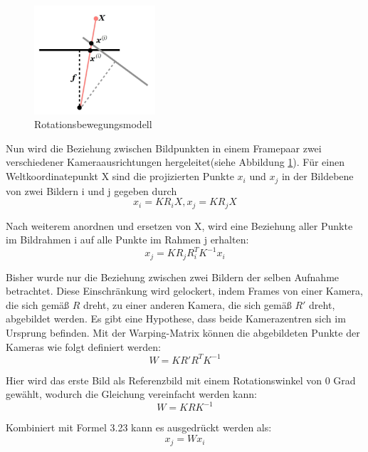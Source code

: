 \begin{figure}[H]
 \centering 
 \includegraphics[keepaspectratio,width=0.4\textwidth]{images/3_Ersteverfahren/Kamera/rotationsmodel.pdf}
 \caption{Rotationsbewegungsmodell\cite{Karpenko}}
 \label{fig:rotationsmodel}
\end{figure} 

Nun wird die Beziehung zwischen Bildpunkten in einem Framepaar zwei verschiedener Kameraausrichtungen hergeleitet(siehe Abbildung \ref{fig:rotationsmodel}). Für einen Weltkoordinatepunkt X sind die projizierten Punkte $x_i$ und $x_j$ in der Bildebene von zwei Bildern i und j gegeben durch
\begin{equation}
   x_i = KR_iX, x_j = KR_jX
\end{equation}

Nach weiterem anordnen und ersetzen von X, wird eine Beziehung aller Punkte im Bildrahmen i auf alle Punkte im Rahmen j erhalten:
\begin{equation}
   x_j = KR_jR_i^TK^{-1}x_i
\end{equation}

Bisher wurde nur die Beziehung zwischen zwei Bildern der selben Aufnahme betrachtet. Diese Einschränkung wird gelockert, indem Frames von einer Kamera, die sich gemäß $R$ dreht, zu einer anderen Kamera, die sich gemäß $R'$ dreht, abgebildet werden. Es gibt eine Hypothese, dass beide Kamerazentren sich im Ursprung befinden. Mit der Warping-Matrix können die abgebildeten Punkte der Kameras wie folgt definiert werden:
\begin{equation}
   W = KR'R^TK^{-1}
\end{equation}

Hier wird das erste Bild als Referenzbild mit einem Rotationswinkel von 0 Grad gewählt, wodurch die Gleichung vereinfacht werden kann:
\begin{equation}
   W = KRK^{-1}
\end{equation}

Kombiniert mit Formel 3.23 kann es ausgedrückt werden als:
\begin{equation}
   x_j = Wx_i
\end{equation}

